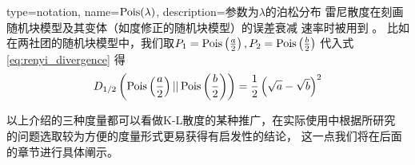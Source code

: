{
  type=notation,
  name={$\operatorname{Pois}(\lambda)$},
  description={参数为$\lambda$的泊松分布}
}
雷尼散度在刻画随机块模型及其变体（如度修正的随机块模型）的误差衰减
速率时被用到 \cite{zhang2016, gao2018community}。
比如在两社团的随机块模型中，我们取$P_1=\operatorname{Pois}\left(\frac{a}{2}\right),P_2=\operatorname{Pois}\left(\frac{b}{2}\right)$
代入式 \eqref{eq:renyi_divergence} 
得
\begin{equation}\label{eq:renyi_d12_ab}
  D_{1/2} \left(
    \operatorname{Pois}\left(\frac{a}{2}\right) || \operatorname{Pois}\left(\frac{b}{2}\right)
  \right)
  = \frac{1}{2}\left(\sqrt{a} - \sqrt{b}\right)^2
\end{equation}

以上介绍的三种度量都可以看做K-L散度的某种推广，在实际使用中根据所研究
的问题选取较为方便的度量形式更易获得有启发性的结论，
这一点我们将在后面的章节进行具体阐示。
